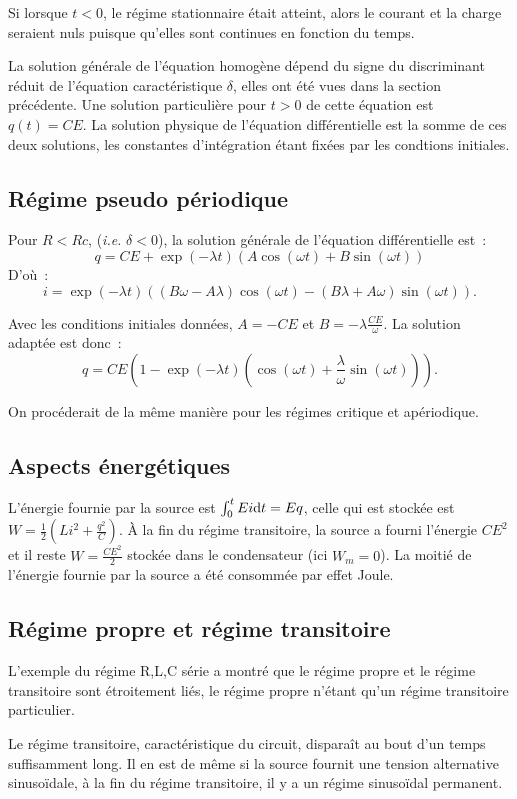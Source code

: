 Si lorsque $t<0$, le régime stationnaire était atteint, alors le courant et la charge seraient nuls puisque qu'elles sont continues en fonction du temps.

La solution générale de l'équation homogène dépend du signe du discriminant réduit de l'équation caractéristique $\delta$, elles ont été vues dans la section précédente. Une solution particulière pour $t>0$ de cette équation est $q(t)=CE$. La solution physique de l'équation différentielle est la somme de ces deux solutions, les constantes d'intégration étant fixées par les condtions initiales.

\subsection{Régime pseudo périodique}
Pour $R<Rc$, (\emph{i.e.} $\delta<0$), la solution générale de l'équation différentielle est~:
\begin{equation}
q = CE + \exp(-\lambda t)(A\cos(\omega t) + B\sin(\omega t))
\end{equation}
D'où~:
\begin{equation}
i = \exp(-\lambda t)((B\omega-A\lambda)\cos(\omega t) - (B \lambda+A \omega)\sin(\omega t)).
\end{equation}

Avec les conditions initiales données, $A=-CE$ et $B=-\lambda \frac{CE}{\omega}$. La solution adaptée est donc~:
\begin{equation}
q = CE\left(1 - \exp(-\lambda t) \left(\cos(\omega t) + \frac{\lambda}{\omega} \sin(\omega t) \right)\right).
\end{equation}

On procéderait de la même manière pour les régimes critique et apériodique.

\subsection{Aspects énergétiques}

L'énergie fournie par la source est $\int_0^t E i \mathrm{d} t = Eq$, celle qui est stockée est $W = \frac{1}{2} \left(Li^2 + \frac{q^2}{C}\right)$. À la fin du régime transitoire, la source a fourni l'énergie $CE^2$ et il reste $W=\frac{CE^2}{2}$ stockée dans le condensateur (ici $W_m=0$). La moitié de l'énergie fournie par la source a été consommée par effet Joule.

\subsection{Régime propre et régime transitoire}
L'exemple du régime R,L,C série a montré que le régime propre et le régime transitoire sont étroitement liés, le régime propre n'étant qu'un régime transitoire particulier.

Le régime transitoire, caractéristique du circuit, disparaît au bout d'un temps suffisamment long. Il en est de même si la source fournit une tension alternative sinusoïdale, à la fin du régime transitoire, il y a un régime sinusoïdal permanent.